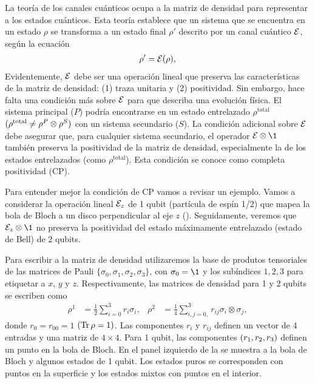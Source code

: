 La teoría de los canales cuánticos ocupa a la matriz de densidad para 
representar a los estados cuánticos. Esta teoría establece que un 
sistema que se encuentra en un estado $\rho$ se transforma a un 
estado final $\rho'$ descrito por un canal cuántico
$\mathcal{E}$, según la ecuación~\cite{nielsen_chuang_2011}
\begin{align} \label{eq:E(rho)}
\rho' = \mathcal{E} (\rho),
\end{align} 
Evidentemente, $\mathcal{E}$ debe ser una operación lineal 
que preserva las características de la matriz de densidad: (1) traza
unitaria y (2) positividad. Sin embargo, hace falta una condición 
más sobre $\mathcal{E}$ para que describa una evolución física. El sistema
principal ($P$) podría encontrarse en un estado entrelazado 
$\rho^{\text{total}}$ $(\rho^{\text{total}}\neq \rho^P\otimes\rho^S)$ 
con un sistema secundario ($S$). La condición adicional sobre $\mathcal{E}$ 
debe asegurar que, para cualquier sistema secundario, el operador $\E\ot\1$ 
también preserva la positividad de la matriz de densidad, especialmente 
la de los estados entrelazados (como $\rho^{\text{total}}$). Esta 
condición se conoce como completa positividad (CP).

Para entender mejor la condición de CP vamos a revisar un 
ejemplo. Vamos a considerar la operación lineal $\mathcal{E}_z$ de 1 qubit (partícula
de espín 1/2) que mapea la bola de Bloch a un disco perpendicular 
al eje $z$ (). 
Seguidamente, veremos que $\E_z \ot\1$ no preserva la
positividad del estado máximamente entrelazado (estado de Bell)
de 2 qubits.

Para escribir a la matriz de densidad utilizaremos 
la base de produtos tensoriales de las matrices de Pauli
$\{ \sigma_0, \sigma_1, \sigma_2, \sigma_3\}$,
con $\sigma_0=\1$ y los subíndices $1,2,3$ para etiquetar a $x$, $y$ y $z$.
Respectivamente, las matrices de densidad para 1 y 2 qubits se 
escriben como~\cite{nielsen_chuang_2011}
\begin{align}
\rho^1&=\frac{1}{2}\sum_{i=0}^{3} r_i\sigma_i,
& 
\rho^2&=\frac{1}{4}\sum _{i,j=0, }^{3}r_{ij}\sigma_i\otimes\sigma_j,
\label{eq:densityMatrices_1and2Qubits}
\end{align}
donde $r_0=r_{00}=1$ $(\Tr\rho=1)$.
Las componentes $r_i$ y $r_{ij}$ definen un vector de 4 entradas
y una matriz de $4\times4$.
Para 1 qubit, las componentes $\qty(r_1, r_2, r_3)$ definen 
un punto en la bola de Bloch.
En el panel izquierdo de la  
se muestra a la bola de Bloch y algunos estados de 1 qubit. 
Los estados puros se corresponden con puntos en la superficie
y los estados mixtos con puntos en el interior.



